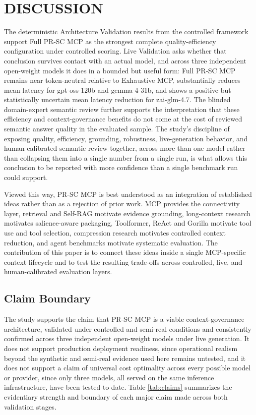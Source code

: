 \section{DISCUSSION}

The deterministic Architecture Validation results from the controlled framework support Full PR-SC MCP as the strongest complete quality-efficiency configuration under controlled scoring. Live Validation asks whether that conclusion survives contact with an actual model, and across three independent open-weight models it does in a bounded but useful form: Full PR-SC MCP remains near token-neutral relative to Exhaustive MCP, substantially reduces mean latency for gpt-oss-120b and gemma-4-31b, and shows a positive but statistically uncertain mean latency reduction for zai-glm-4.7. The blinded domain-expert semantic review further supports the interpretation that these efficiency and context-governance benefits do not come at the cost of reviewed semantic answer quality in the evaluated sample. The study's discipline of exposing quality, efficiency, grounding, robustness, live-generation behavior, and human-calibrated semantic review together, across more than one model rather than collapsing them into a single number from a single run, is what allows this conclusion to be reported with more confidence than a single benchmark run could support.

Viewed this way, PR-SC MCP is best understood as an integration of established ideas rather than as a rejection of prior work. MCP provides the connectivity layer, retrieval and Self-RAG motivate evidence grounding, long-context research motivates salience-aware packaging, Toolformer, ReAct and Gorilla motivate tool use and tool selection, compression research motivates controlled context reduction, and agent benchmarks motivate systematic evaluation. The contribution of this paper is to connect these ideas inside a single MCP-specific context lifecycle and to test the resulting trade-offs across controlled, live, and human-calibrated evaluation layers.

\subsection{Claim Boundary}

The study supports the claim that PR-SC MCP is a viable context-governance architecture, validated under controlled and semi-real conditions and consistently confirmed across three independent open-weight models under live generation. It does not support production deployment readiness, since operational realism beyond the synthetic and semi-real evidence used here remains untested, and it does not support a claim of universal cost optimality across every possible model or provider, since only three models, all served on the same inference infrastructure, have been tested to date. Table \ref{tab:claims} summarizes the evidentiary strength and boundary of each major claim made across both validation stages.

